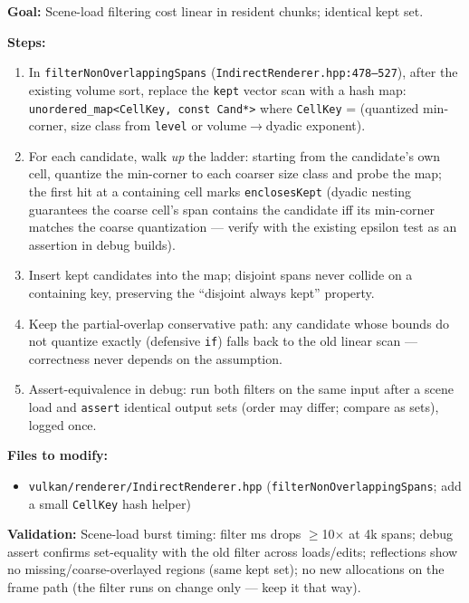 \documentclass[11pt,a4paper]{article}
\begin{document}
\begin{tcolorbox}[promptbox={Prompt: Make the Non-Overlapping-Span Filter Linear}]
\textbf{Goal:} Scene-load filtering cost linear in resident chunks; identical kept set.

\textbf{Steps:}
\begin{enumerate}
    \item In \texttt{filterNonOverlappingSpans} (\texttt{IndirectRenderer.hpp:478--527}), after the existing volume sort, replace the \texttt{kept} vector scan with a hash map: \texttt{unordered\_map<CellKey, const Cand*>} where \texttt{CellKey} = (quantized min-corner, size class from \texttt{level} or volume$\to$dyadic exponent).
    \item For each candidate, walk \emph{up} the ladder: starting from the candidate's own cell, quantize the min-corner to each coarser size class and probe the map; the first hit at a containing cell marks \texttt{enclosesKept} (dyadic nesting guarantees the coarse cell's span contains the candidate iff its min-corner matches the coarse quantization --- verify with the existing epsilon test as an assertion in debug builds).
    \item Insert kept candidates into the map; disjoint spans never collide on a containing key, preserving the ``disjoint always kept'' property.
    \item Keep the partial-overlap conservative path: any candidate whose bounds do not quantize exactly (defensive \texttt{if}) falls back to the old linear scan --- correctness never depends on the assumption.
    \item Assert-equivalence in debug: run both filters on the same input after a scene load and \texttt{assert} identical output sets (order may differ; compare as sets), logged once.
\end{enumerate}

\textbf{Files to modify:}
\begin{itemize}
    \item \texttt{vulkan/renderer/IndirectRenderer.hpp} (\texttt{filterNonOverlappingSpans}; add a small \texttt{CellKey} hash helper)
\end{itemize}

\textbf{Validation:} Scene-load burst timing: filter ms drops $\geq$10$\times$ at 4k spans; debug assert confirms set-equality with the old filter across loads/edits; reflections show no missing/coarse-overlayed regions (same kept set); no new allocations on the frame path (the filter runs on change only --- keep it that way).
\end{tcolorbox}
\end{document}
